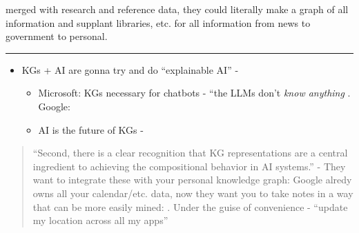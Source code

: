 merged with research and reference data, they could literally make a
graph of all information and supplant libraries, etc. for all
information from news to government to personal.

\begin{center}\rule{0.5\linewidth}{0.5pt}\end{center}

\begin{itemize}

\item
  KGs + AI are gonna try and do ``explainable AI'' - \cite{janowiczNeuralsymbolicIntegrationSemantic2020, renLegoLatentExecutionguided2021} 

  \begin{itemize}
  
  \item
    Microsoft: KGs necessary for chatbots - ``the LLMs don't \emph{know
    anything} \cite{huEmpoweringLanguageModels2022} . Google:
    \cite{renLegoLatentExecutionguided2021} 
  \item
    AI is the future of KGs - \cite{chaudhriKnowledgeGraphsIntroduction2022} 
  \end{itemize}
\end{itemize}

\begin{quote}
``Second, there is a clear recognition that KG representations are a
central ingredient to achieving the compositional behavior in AI
systems.'' - They want to integrate these with your personal knowledge
graph: Google alredy owns all your calendar/etc. data, now they want you
to take notes in a way that can be more easily mined: \cite{balogPersonalKnowledgeGraphs2019a} . Under the guise of convenience -
``update my location across all my apps''
\end{quote}

